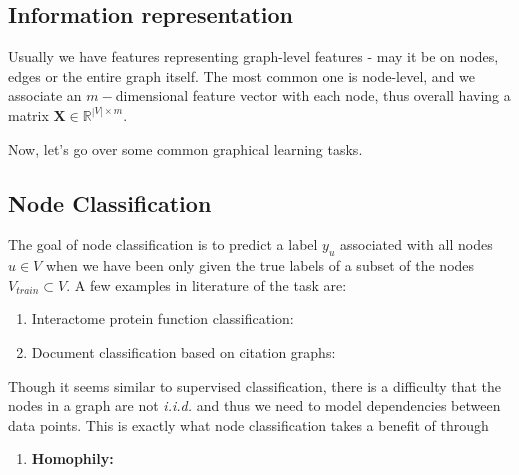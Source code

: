 \subsection{Information representation}
Usually we have features representing graph-level features - may it be on nodes, edges or the entire graph itself. The most common one is node-level, and we associate an $m-$dimensional feature vector with each node, thus overall having a matrix $\mathbf{X} \in \mathbb{R}^{|V| \times m}$.

Now, let's go over some common graphical learning tasks.
\subsection{Node Classification}
The goal of node classification is to predict a label $y_u$ associated with all nodes $u \in V$ when we have been only given the true labels of a subset of the nodes $V_{train} \subset V$. A few examples in literature of the task are:
\begin{enumerate}
	\item Interactome protein function classification: \cite{graphsage}
	\item Document classification based on citation graphs: \cite{gcn}
\end{enumerate}
Though it seems similar to supervised classification, there is a difficulty that the nodes in a graph are not \textit{i.i.d.} and thus we need to model dependencies between data points. This is exactly what node classification takes a benefit of through 
\begin{enumerate}
	\item \textbf{Homophily:}
\end{enumerate}
